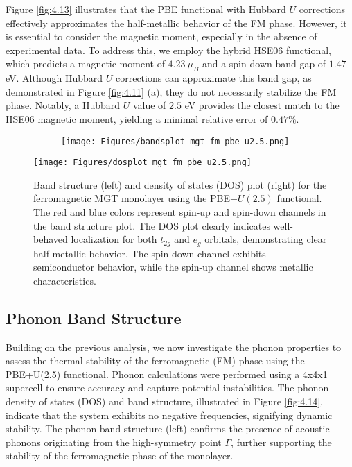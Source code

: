 Figure \ref{fig:4.13} illustrates that the PBE functional with Hubbard $U$ corrections effectively approximates the half-metallic behavior of the FM phase. However, it is essential to consider the magnetic moment, especially in the absence of experimental data. To address this, we employ the hybrid HSE06 functional, which predicts a magnetic moment of $4.23 \ \mu_{B}$ and a spin-down band gap of $1.47$ eV. Although Hubbard $U$ corrections can approximate this band gap, as demonstrated in Figure \ref{fig:4.11} (a), they do not necessarily stabilize the FM phase. Notably, a Hubbard $U$ value of $2.5$ eV provides the closest match to the HSE06 magnetic moment, yielding a minimal relative error of $0.47\%$.

\begin{figure}[H]
	\begin{subfigure}{.5\textwidth}
		\centering
		\texttt{[image: Figures/bandsplot\_mgt\_fm\_pbe\_u2.5.png]}
	\end{subfigure}%
	\begin{minipage}{.5\textwidth}
		\vspace{-12.4cm}
		\centering
		\texttt{[image: Figures/dosplot\_mgt\_fm\_pbe\_u2.5.png]}
		\captionsetup{justification=centering}
	\end{minipage}
	\caption{Band structure (left) and density of states (DOS) plot (right) for the ferromagnetic MGT monolayer using the PBE$+U(2.5)$ functional. The red and blue colors represent spin-up and spin-down channels in the band structure plot. The DOS plot clearly indicates well-behaved localization for both $t_{2g}$ and $e_{g}$ orbitals, demonstrating clear half-metallic behavior. The spin-down channel exhibits semiconductor behavior, while the spin-up channel shows metallic characteristics.}
	\label{fig:mgtpbeucorrection}
\end{figure}


\subsection{Phonon Band Structure}

Building on the previous analysis, we now investigate the phonon properties to assess the thermal stability of the ferromagnetic (FM) phase using the PBE+U(2.5) functional. Phonon calculations were performed using a 4x4x1 supercell to ensure accuracy and capture potential instabilities. The phonon density of states (DOS) and band structure, illustrated in Figure \ref{fig:4.14}, indicate that the system exhibits no negative frequencies, signifying dynamic stability. The phonon band structure (left) confirms the presence of acoustic phonons originating from the high-symmetry point $\Gamma$, further supporting the stability of the ferromagnetic phase of the monolayer.

